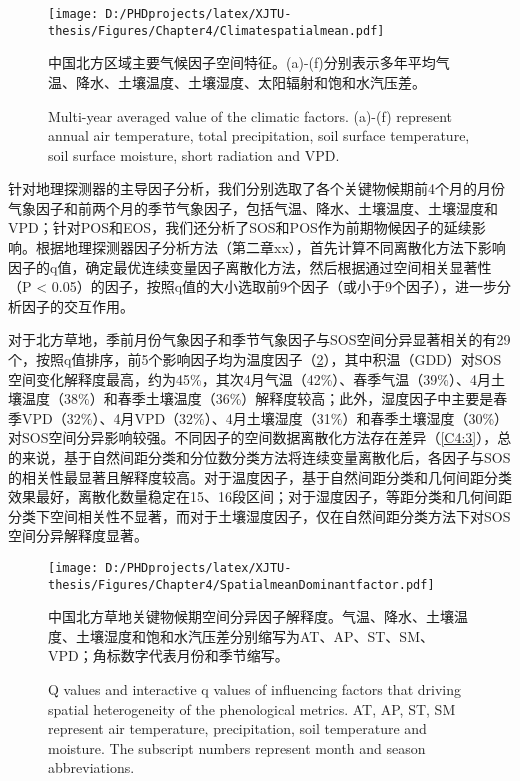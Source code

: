 \renewcommand{\dblfloatpagefraction}{.8}
\begin{figure}[ht]
  \centering
  \setlength\abovedisplayskip{0pt}
  \texttt{[image: D:/PHDprojects/latex/XJTU-thesis/Figures/Chapter4/Climatespatialmean.pdf]}
  \caption{中国北方区域主要气候因子空间特征。(a)-(f)分别表示多年平均气温、降水、土壤温度、土壤湿度、太阳辐射和饱和水汽压差。}
  \addtocounter{figure}{-1}
  \vspace{5pt}
  \renewcommand{\figurename}{Fig}
  \caption{Multi-year averaged value of the climatic factors. (a)-(f) represent annual air temperature, total precipitation, soil surface temperature, soil surface moisture, short radiation and VPD.}
  \label{C4:1}
\end{figure}

针对地理探测器的主导因子分析，我们分别选取了各个关键物候期前4个月的月份气象因子和前两个月的季节气象因子，包括气温、降水、土壤温度、土壤湿度和VPD；针对POS和EOS，我们还分析了SOS和POS作为前期物候因子的延续影响。根据地理探测器因子分析方法（第二章xx），首先计算不同离散化方法下影响因子的q值，确定最优连续变量因子离散化方法，然后根据通过空间相关显著性（P < 0.05）的因子，按照q值的大小选取前9个因子（或小于9个因子），进一步分析因子的交互作用。

对于北方草地，季前月份气象因子和季节气象因子与SOS空间分异显著相关的有29个，按照q值排序，前5个影响因子均为温度因子（\cref{C4:2}），其中积温（GDD）对SOS空间变化解释度最高，约为45\%，其次4月气温（42\%）、春季气温（39\%）、4月土壤温度（38\%）和春季土壤温度（36\%）解释度较高；此外，湿度因子中主要是春季VPD（32\%）、4月VPD（32\%）、4月土壤湿度（31\%）和春季土壤湿度（30\%）对SOS空间分异影响较强。不同因子的空间数据离散化方法存在差异（\cref{C4:3}），总的来说，基于自然间距分类和分位数分类方法将连续变量离散化后，各因子与SOS的相关性最显著且解释度较高。对于温度因子，基于自然间距分类和几何间距分类效果最好，离散化数量稳定在15、16段区间；对于湿度因子，等距分类和几何间距分类下空间相关性不显著，而对于土壤湿度因子，仅在自然间距分类方法下对SOS空间分异解释度显著。

\renewcommand{\dblfloatpagefraction}{.8}
\begin{figure}[ht]
  \centering
  \setlength\abovedisplayskip{0pt}
  \texttt{[image: D:/PHDprojects/latex/XJTU-thesis/Figures/Chapter4/SpatialmeanDominantfactor.pdf]}
  \caption{中国北方草地关键物候期空间分异因子解释度。气温、降水、土壤温度、土壤湿度和饱和水汽压差分别缩写为AT、AP、ST、SM、VPD；角标数字代表月份和季节缩写。}
  \addtocounter{figure}{-1}
  \vspace{5pt}
  \renewcommand{\figurename}{Fig}
  \caption{Q values and interactive q values of influencing factors that driving spatial heterogeneity of the phenological metrics. AT, AP, ST, SM represent air temperature, precipitation, soil temperature and moisture. The subscript numbers represent month and season abbreviations.}
  \label{C4:2}
\end{figure}


